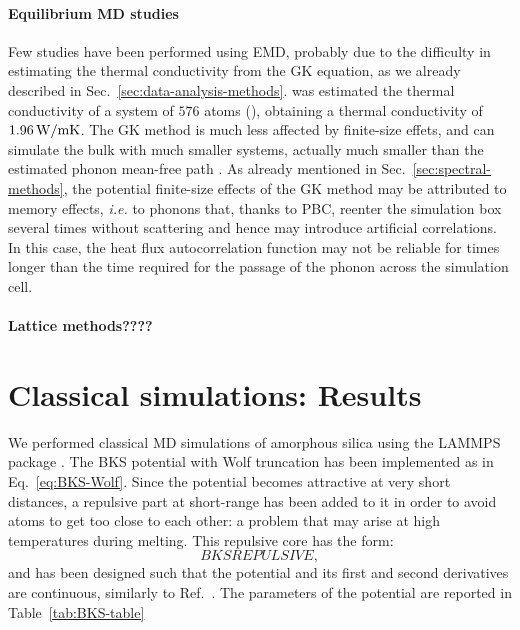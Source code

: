 \paragraph{Equilibrium MD studies}
Few studies have been performed using EMD, probably due to the difficulty in estimating the thermal conductivity from the GK equation, as we already described in Sec.~\ref{sec:data-analysis-methods}.
\citet{McGaughey2004b} was estimated the thermal conductivity of a system of $576$ atoms (), obtaining a thermal conductivity of $1.96\,\mathrm{W/mK}$. 
The GK method is much less affected by finite-size effets, and can simulate the bulk with much smaller systems, actually much smaller than the estimated phonon mean-free path \cite{Schelling2002}. As already mentioned in Sec.~\ref{sec:spectral-methods}, the potential finite-size effects of the GK method may be attributed to memory effects, \emph{i.e.} to phonons that, thanks to PBC, reenter the simulation box several times without scattering and hence may introduce artificial correlations. In this case, the heat flux autocorrelation function may not be reliable for times longer than the time required for the passage of the phonon across the simulation cell. 

\paragraph{Lattice methods????}


\section{Classical simulations: Results}
We performed classical MD simulations of amorphous silica using the \textsc{LAMMPS} package \cite{LAMMPS1995}. The BKS potential with Wolf truncation has been implemented as in Eq.~\eqref{eq:BKS-Wolf}. 
Since the potential becomes attractive at very short distances, a repulsive part at short-range has been added to it in order to avoid atoms to get too close to each other: a problem that may arise at high temperatures during melting. This repulsive core has the form:
\begin{equation}
    BKSREPULSIVE, \label{eq:BKS-repulsive-core}
\end{equation}
and has been designed such that the potential and its first and second derivatives are continuous, similarly to Ref.~\cite{Mantisi2012}. The parameters of the potential are reported in Table~\ref{tab:BKS-table}

